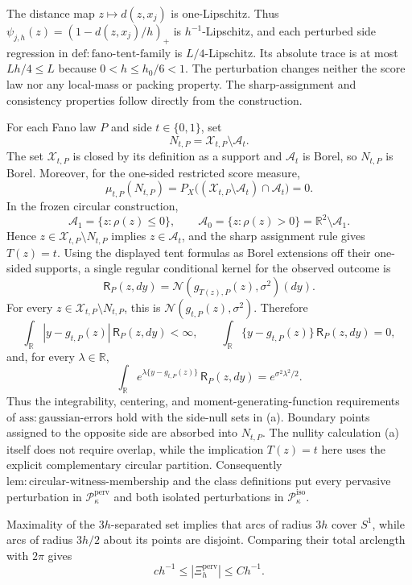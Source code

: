 The distance map \(z\mapsto d(z,x_j)\) is one-Lipschitz. Thus \(\psi_{j,h}(z)=(1-d(z,x_j)/h)_+\) is \(h^{-1}\)-Lipschitz, and each perturbed side regression in \(\mathrm{def:fano\text{-}tent\text{-}family}\) is \(L/4\)-Lipschitz. Its absolute trace is at most \(Lh/4\le L\) because \(0<h\le h_0/6<1\). The perturbation changes neither the score law nor any local-mass or packing property. The sharp-assignment and consistency properties follow directly from the construction.

For each Fano law \(P\) and side \(t\in\{0,1\}\), set
\[
 N_{t,P}=\mathcal X_{t,P}\setminus\mathcal A_t.
\]
The set \(\mathcal X_{t,P}\) is closed by its definition as a support and
\(\mathcal A_t\) is Borel, so \(N_{t,P}\) is Borel.  Moreover, for the
one-sided restricted score measure,
\[
 \mu_{t,P}(N_{t,P})
 =P_X\bigl((\mathcal X_{t,P}\setminus\mathcal A_t)
             \cap\mathcal A_t\bigr)=0. \tag{a}
\]
In the frozen circular construction,
\[
 \mathcal A_1=\{z:\rho(z)\le0\},
 \qquad
 \mathcal A_0=\{z:\rho(z)>0\}
 =\mathbb R^2\setminus\mathcal A_1.
\]
Hence \(z\in\mathcal X_{t,P}\setminus N_{t,P}\) implies
\(z\in\mathcal A_t\), and the sharp assignment rule gives \(T(z)=t\).
Using the displayed tent formulas as Borel extensions off their
one-sided supports, a single regular conditional kernel for the
observed outcome is
\[
 \mathsf R_P(z,dy)
 =\mathcal N(g_{T(z),P}(z),\sigma^2)(dy).
\]
For every \(z\in\mathcal X_{t,P}\setminus N_{t,P}\), this is
\(\mathcal N(g_{t,P}(z),\sigma^2)\).  Therefore
\[
 \int_{\mathbb R}|y-g_{t,P}(z)|\,\mathsf R_P(z,dy)<\infty,
 \qquad
 \int_{\mathbb R}\{y-g_{t,P}(z)\}\,\mathsf R_P(z,dy)=0,
\]
and, for every \(\lambda\in\mathbb R\),
\[
 \int_{\mathbb R}e^{\lambda\{y-g_{t,P}(z)\}}
 \,\mathsf R_P(z,dy)
 =e^{\sigma^2\lambda^2/2}.
\]
Thus the integrability, centering, and moment-generating-function
requirements of \(\mathrm{ass:gaussian\text{-}errors}\) hold with the
side-null sets in (a).  Boundary points assigned to the opposite side
are absorbed into \(N_{t,P}\).  The nullity calculation (a) itself does
not require overlap, while the implication \(T(z)=t\) here uses the
explicit complementary circular partition.  Consequently
\(\mathrm{lem:circular\text{-}witness\text{-}membership}\) and the class
definitions put every pervasive perturbation in
\(\mathcal P_{\kappa}^{\mathrm{perv}}\) and both isolated perturbations in
\(\mathcal P_{\kappa}^{\mathrm{iso}}\).

Maximality of the \(3h\)-separated set implies that arcs of radius \(3h\) cover \(S^1\), while arcs of radius \(3h/2\) about its points are disjoint. Comparing their total arclength with \(2\pi\) gives
\[
 c h^{-1}\le |\Xi_h^{\mathrm{perv}}|\le C h^{-1}. \tag{7}
\]

